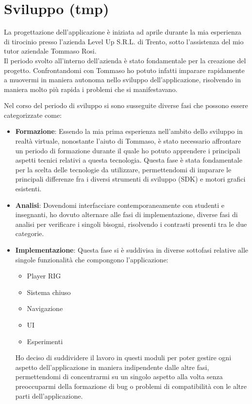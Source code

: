 \chapter{Sviluppo (tmp)}
\label{cha:sviluppo}

La progettazione dell'applicazione è iniziata ad aprile durante la mia
esperienza di tirocinio presso l'azienda Level Up S.R.L. di Trento, sotto l'assistenza
del mio tutor aziendale Tommaso Rosi.\\ Il periodo svolto all'interno dell'azienda
è stato fondamentale per la creazione del progetto. Confrontandomi con Tommaso ho
potuto infatti imparare rapidamente a muovermi in maniera autonoma nello sviluppo
dell'applicazione, risolvendo in maniera molto più rapida i problemi che si
manifestavano.

Nel corso del periodo di sviluppo si sono susseguite diverse fasi che possono
essere categorizzate come:
\begin{itemize}
  \item \textbf{Formazione}: Essendo la mia prima esperienza nell'ambito dello sviluppo
    in realtà virtuale, nonostante l'aiuto di Tommaso, è stato necessario affrontare
    un periodo di formazione durante il quale ho potuto apprendere i principali aspetti
    tecnici relativi a questa tecnologia. Questa fase è stata fondamentale per
    la scelta delle tecnologie da utilizzare, permettendomi di imparare le principali
    differenze fra i diversi strumenti di sviluppo (SDK) e motori grafici esistenti.

  \item \textbf{Analisi}: Dovendomi interfacciare contemporaneamente con studenti
    e insegnanti, ho dovuto alternare alle fasi di implementazione, diverse fasi
    di analisi per verificare i singoli bisogni, risolvendo i contrasti presenti
    tra le due categorie.

  \item \textbf{Implementazione}: Questa fase si è suddivisa in diverse sottofasi
    relative alle singole funzionalità che compongono l'applicazione:
    \begin{itemize}
      \item Player RIG

      \item Sistema chiuso

      \item Navigazione

      \item UI

      \item Esperimenti
    \end{itemize}
    Ho deciso di suddividere il lavoro in questi moduli per poter gestire ogni
    aspetto dell'applicazione in maniera indipendente dalle altre fasi, permettendomi
    di concentrarmi su un singolo aspetto alla volta senza preoccuparmi della formazione
    di bug o problemi di compatibilità con le altre parti dell'applicazione.
\end{itemize}






